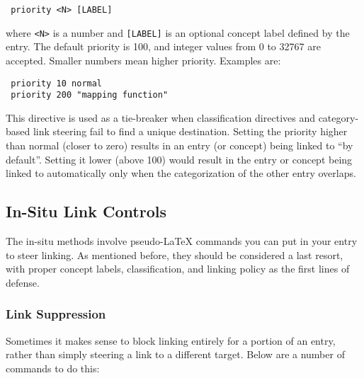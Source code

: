 \begin{verbatim}
 priority <N> [LABEL]
\end{verbatim}

 where \verb=<N>= is a number and \verb=[LABEL]= is an optional concept label defined by the entry. The default priority is 100, and integer values from 0 to 32767 are accepted. Smaller numbers mean higher priority. Examples are:

\begin{verbatim}
 priority 10 normal
 priority 200 "mapping function"
\end{verbatim}

 This directive is used as a tie-breaker when classification directives and category-based link steering fail to find a unique destination. Setting the priority higher than normal (closer to zero) results in an entry (or concept) being linked to ``by default''. Setting it lower (above 100) would result in the entry or concept being linked to automatically only when the categorization of the other entry overlaps.

\subsection*{In-Situ Link Controls}

The in-situ methods involve pseudo-\LaTeX{} commands you can put in your entry to steer linking. As mentioned before, they should be considered a last resort, with proper concept labels, classification, and linking policy as the first lines of defense.

\subsubsection*{Link Suppression}

Sometimes it makes sense to block linking entirely for a portion of an entry, rather than simply steering a link to a different target. Below are a number of commands to do this:

